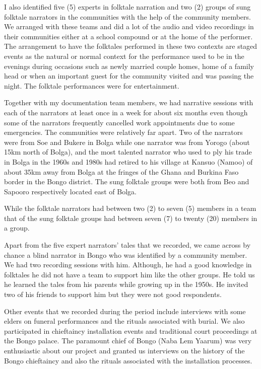 \documentclass[output=paper,colorlinks,citecolor=brown]{langscibook}
\begin{document}
I also identified five (5) experts in folktale narration and two (2) groups of sung folktale narrators in the communities with the help of the community members. We arranged with these teams and did a lot of the audio and video recordings in their communities either at a school compound or at the home of the performer. The arrangement to have the folktales performed in these two contexts are staged events as the natural or normal context for the performance used to be in the evenings during occasions such as newly married couple homes, home of a family head or when an important guest for the community visited and was passing the night. The folktale performances were for entertainment.  

Together with my documentation team members, we had narrative sessions with each of the narrators at least once in a week for about six months even though some of the narrators frequently cancelled work appointments due to some emergencies. The communities were relatively far apart. Two of the narrators were from Soe and Bukere in Bolga while one narrator was from Yorogo (about 15km north of Bolga), and the most talented narrator who used to ply his trade in Bolga in the 1960s and 1980s had retired to his village at Kansuo (Namoo) of about 35km away from Bolga at the fringes of the Ghana and Burkina Faso border in the Bongo district. The sung folktale groups were both from Beo and Sapooro respectively located east of Bolga. 

While the folktale narrators had between two (2) to seven (5) members in a team that of the sung folktale groups had between seven (7) to twenty (20) members in a group.

Apart from the five expert narrators’ tales that we recorded, we came across by chance a blind narrator in Bongo who was identified by a community member. We had two recording sessions with him. Although, he had a good knowledge in folktales he did not have a team to support him like the other groups. He told us he learned the tales from his parents while growing up in the 1950s. He invited two of his friends to support him but they were not good respondents.

Other events that we recorded during the period include interviews with some elders on funeral performances and the rituals associated with burial. We also participated in chieftaincy installation events and traditional court proceedings at the Bongo palace. The paramount chief of Bongo (Naba Lem Yaarum) was very enthusiastic about our project and granted us interviews on the history of the Bongo chieftaincy and also the rituals associated with the installation processes. 
\end{document}

